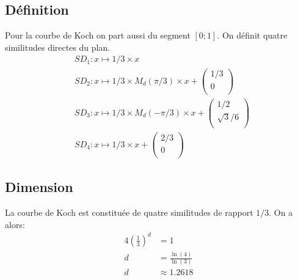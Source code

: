 \documentclass[a4paper, 12pt]{report}
\begin{document}
			\subsection{Définition}
				Pour la courbe de Koch on part aussi du segment $[0;1]$. On définit quatre similitudes directes du plan.
				\begin{align*}
					&SD_1:x\mapsto 1/3\times x\\
					&SD_2:x\mapsto 1/3\times M_d(\pi/3)\times x+\left(	\begin{array}{ccc}
															1/3\\
															0\\
														\end{array}\right)\\
					&SD_3:x\mapsto 1/3\times M_d(-\pi/3)\times x+\left(	\begin{array}{ccc}
															1/2\\
															\sqrt{3}/6\\
														\end{array}\right)\\
					&SD_4:x\mapsto 1/3\times x+\left(	\begin{array}{ccc}
															2/3\\
															0\\
														\end{array}\right)
				\end{align*}
			\subsection{Dimension}
				La courbe de Koch est constituée de quatre similitudes de rapport $1/3$. On a alors:
				\begin{align*}
					 4\left(\frac{1}{3}\right)^d	&=1\\
												d	&=\frac{\ln(4)}{\ln(3)}\\
												d	&\approx 1.2618
				\end{align*}
\newpage
\end{document}
